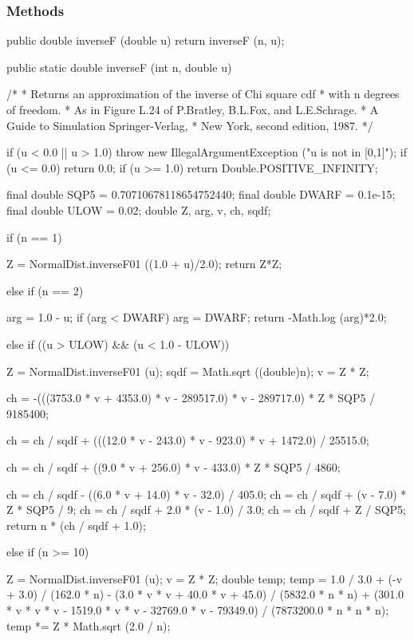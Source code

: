 \subsubsection* {Methods}
\begin{code}\begin{hide}

   public double inverseF (double u) {
      return inverseF (n, u);
   }\end{hide}

   public static double inverseF (int n, double u)\begin{hide} {
      /*
       * Returns an approximation of the inverse of Chi square cdf
       * with n degrees of freedom.
       * As in Figure L.24 of P.Bratley, B.L.Fox, and L.E.Schrage.
       *         A Guide to Simulation Springer-Verlag,
       *         New York, second edition, 1987.
       */

      if (u < 0.0 || u > 1.0)
         throw new IllegalArgumentException ("u is not in [0,1]");
      if (u <= 0.0)
         return 0.0;
      if (u >= 1.0)
         return Double.POSITIVE_INFINITY;

      final double SQP5 = 0.70710678118654752440;
      final double DWARF = 0.1e-15;
      final double ULOW = 0.02;
      double Z, arg, v, ch, sqdf;

      if (n == 1) {
          Z = NormalDist.inverseF01 ((1.0 + u)/2.0);
          return Z*Z;

      } else if (n == 2) {
         arg = 1.0 - u;
         if (arg < DWARF)
            arg = DWARF;
         return -Math.log (arg)*2.0;

     } else if ((u > ULOW) && (u < 1.0 - ULOW)) {
        Z = NormalDist.inverseF01 (u);
        sqdf = Math.sqrt ((double)n);
        v = Z * Z;

        ch = -(((3753.0 * v + 4353.0) * v - 289517.0) * v -
           289717.0) * Z * SQP5 / 9185400;

        ch = ch / sqdf + (((12.0 * v - 243.0) * v - 923.0)
           * v + 1472.0) / 25515.0;

        ch = ch / sqdf + ((9.0 * v + 256.0) * v - 433.0)
           * Z * SQP5 / 4860;

        ch = ch / sqdf - ((6.0 * v + 14.0) * v - 32.0) / 405.0;
        ch = ch / sqdf + (v - 7.0) * Z * SQP5 / 9;
        ch = ch / sqdf + 2.0 * (v - 1.0) / 3.0;
        ch = ch / sqdf + Z / SQP5;
        return n * (ch / sqdf + 1.0);

     } else if (n >= 10) {
        Z = NormalDist.inverseF01 (u);
        v = Z * Z;
        double temp;
        temp = 1.0 / 3.0 + (-v + 3.0) / (162.0 * n) -
           (3.0 * v * v + 40.0 * v + 45.0) / (5832.0 * n * n) +
           (301.0 * v * v * v - 1519.0 * v * v - 32769.0 * v -
           79349.0) / (7873200.0 * n * n * n);
        temp *= Z * Math.sqrt (2.0 / n);

}}
\end{hide}
\end{code}
